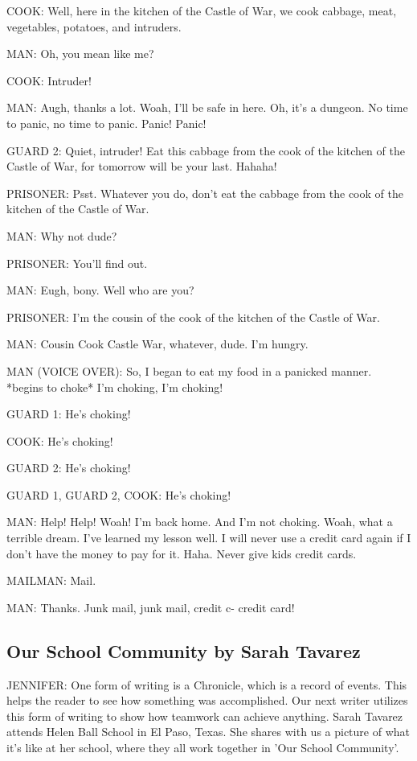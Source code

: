COOK:
Well, here in the kitchen of the Castle of War, we cook cabbage, meat, vegetables, potatoes, and intruders.

MAN:
Oh, you mean like me?

COOK:
Intruder!

MAN:
Augh, thanks a lot.
Woah, I'll be safe in here.
Oh, it's a dungeon.
No time to panic, no time to panic.
Panic!
Panic!

GUARD 2:
Quiet, intruder!
Eat this cabbage from the cook of the kitchen of the Castle of War, for tomorrow will be your last.
Hahaha!

PRISONER:
Psst.
Whatever you do, don't eat the cabbage from the cook of the kitchen of the Castle of War.

MAN:
Why not dude?

PRISONER:
You'll find out.

MAN:
Eugh, bony.
Well who are you?

PRISONER:
I'm the cousin of the cook of the kitchen of the Castle of War.

MAN:
Cousin Cook Castle War, whatever, dude.
I'm hungry.

MAN (VOICE OVER):
So, I began to eat my food in a panicked manner.
*begins to choke*
I'm choking, I'm choking!

GUARD 1:
He's choking!

COOK:
He's choking!

GUARD 2:
He's choking!

GUARD 1, GUARD 2, COOK:
He's choking!

MAN:
Help!
Help!
Woah!
I'm back home.
And I'm not choking.
Woah, what a terrible dream.
I've learned my lesson well.
I will never use a credit card again if I don't have the money to pay for it.
Haha.
Never give kids credit cards.

MAILMAN:
Mail.

MAN:
Thanks.
Junk mail, junk mail, credit c- credit card!

\subsection{Our School Community by Sarah Tavarez}

JENNIFER:
One form of writing is a Chronicle, which is a record of events.
This helps the reader to see how something was accomplished.
Our next writer utilizes this form of writing to show how teamwork can achieve anything.
Sarah Tavarez attends Helen Ball School in El Paso, Texas.
She shares with us a picture of what it's like at her school, where they all work together in 'Our School Community'.

